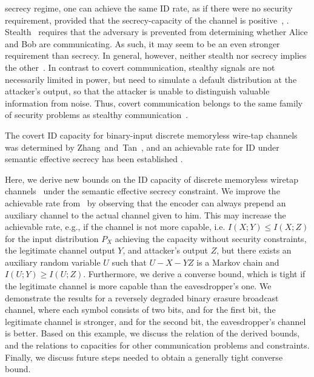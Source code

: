 \documentclass[conference,final]{IEEEtran}
\begin{document}
secrecy
regime, one can achieve the same ID rate,
as if there were no security requirement, provided that
the secrecy-capacity of the channel is positive~\cite{AhlswedeZhang1995Newdirectionstheory}, \cite{wiretapwafa}.
Stealth~\cite{cheJaggiEA2014surveyStealth,HouKramerBloch2017EffectiveSecrecyReliability,songJaggiEA2020stealthMultipathJammed,BlochGuenlueYenerOggierPoorSankarSchaefer2021OverviewInformationTheoretic}
requires that the adversary is prevented
from determining whether Alice and Bob are communicating.
As such, it may seem to be an even stronger requirement than secrecy.
In general, however, neither stealth nor secrecy implies the
other~\cite{HouKramerBloch2017EffectiveSecrecyReliability}.
In contrast to
covert communication\cite{BashGoeckelTowsley2013covertAWGN,BashGoeckelTowsleyGuha2015covertLimits,Bloch2016covertResolvability},
stealthy 
signals are not necessarily limited in power,
but need to simulate a default distribution at the attacker's output,
so that the attacker is unable to distinguish valuable information from noise.
Thus, covert communication belongs to the same family of security problems as
stealthy communication~\cite{HouKramerBloch2017EffectiveSecrecyReliability,LentnerKramer20}.

The covert ID capacity for binary-input discrete memoryless
wire-tap channels was determined by Zhang~and~Tan~\cite{ZhangTan2021CovertIdentificationBinary},
and an achievable rate for ID under semantic effective secrecy
has been established 
\cite{IbrahimFerraraDeppe2021IdentificationEffectiveSecrecy_conference}.

Here, we derive new bounds on the ID capacity of discrete
memoryless wiretap channels~\cite{Wyner1975wiretap,BlochBarros2011phys_sec_book}
under the semantic effective secrecy constraint.
We improve the achievable rate from~\cite{IbrahimFerraraDeppe2021IdentificationEffectiveSecrecy_conference}
by observing that the encoder can always prepend an auxiliary channel
to the actual channel given to him. This may increase the achievable rate, e.g.,
if the channel is not more capable, i.e. $I(X; Y) \le I(X; Z)$ for
the input distribution $P_X$ achieving the capacity without security constraints,
the legitimate channel output $Y$, and attacker's output $Z$, but there exists
an auxiliary random variable $U$ such that $U - X - YZ$ is a Markov chain
and $I(U; Y) \ge I(U; Z)$.
Furthermore, we derive a converse bound,
which is tight if the legitimate channel is more capable
than the eavesdropper's one.
We demonstrate the results for a reversely degraded binary erasure broadcast channel,
where each symbol consists of two bits, and for the first bit, the legitimate channel is
stronger, and for the second bit, the eavesdropper's channel is better.
Based on this example, we discuss the relation of the derived bounds, and the relations
to capacities for other communication problems and constraints.
Finally, we discuss future steps needed to obtain a generally tight converse bound.
\end{document}
